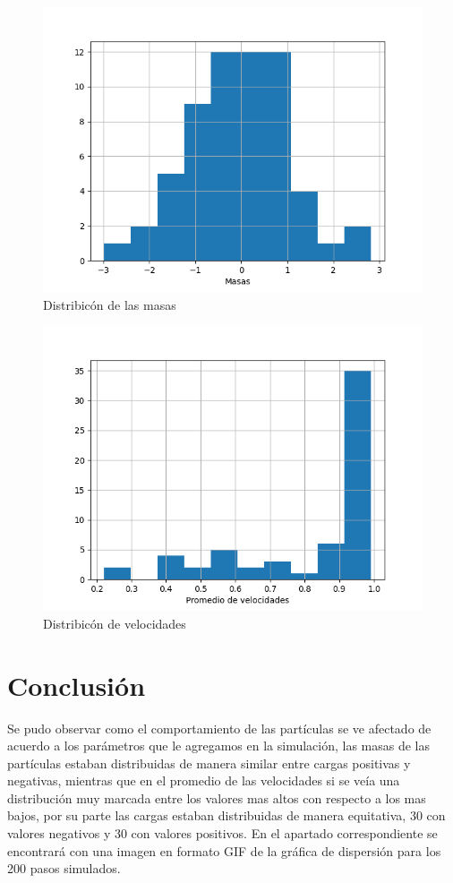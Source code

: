 \documentclass{article}
\begin{document}
\begin{figure}
  \centering
  \includegraphics[scale=0.85]{tareanuevemasas.png}
  \caption{Distribic\'on de las masas}
  \label{fig3}
\end{figure}

\begin{figure}
  \centering
  \includegraphics[scale=0.85]{tareanuevepromedio.png}
  \caption{Distribic\'on de velocidades}
  \label{fig4}
\end{figure}

\newpage
\section{Conclusi\'on}

Se pudo observar como el comportamiento de las part\'iculas se ve afectado de acuerdo a los par\'ametros que le agregamos en la simulaci\'on, las masas de las part\'iculas estaban distribuidas de manera similar entre cargas positivas y negativas, mientras que en el promedio de las velocidades si se ve\'ia una distribuci\'on muy marcada entre los valores mas altos con respecto a los mas bajos, por su parte las cargas estaban distribuidas de manera equitativa, 30 con valores negativos y 30 con valores positivos. En el apartado correspondiente \cite{yo} se encontrar\'a con una imagen en formato GIF de la gr\'afica de dispersi\'on para los 200 pasos simulados.



\end{document}
